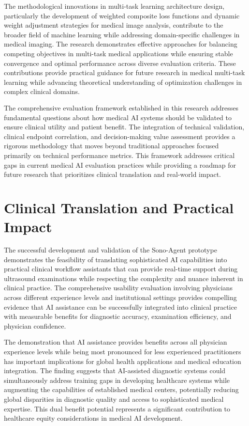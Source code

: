 The methodological innovations in multi-task learning architecture design, particularly the development of weighted composite loss functions and dynamic weight adjustment strategies for medical image analysis, contribute to the broader field of machine learning while addressing domain-specific challenges in medical imaging. The research demonstrates effective approaches for balancing competing objectives in multi-task medical applications while ensuring stable convergence and optimal performance across diverse evaluation criteria. These contributions provide practical guidance for future research in medical multi-task learning while advancing theoretical understanding of optimization challenges in complex clinical domains.

The comprehensive evaluation framework established in this research addresses fundamental questions about how medical AI systems should be validated to ensure clinical utility and patient benefit. The integration of technical validation, clinical endpoint correlation, and decision-making value assessment provides a rigorous methodology that moves beyond traditional approaches focused primarily on technical performance metrics. This framework addresses critical gaps in current medical AI evaluation practices while providing a roadmap for future research that prioritizes clinical translation and real-world impact.

\section{Clinical Translation and Practical Impact}

The successful development and validation of the Sono-Agent prototype demonstrates the feasibility of translating sophisticated AI capabilities into practical clinical workflow assistants that can provide real-time support during ultrasound examinations while respecting the complexity and nuance inherent in clinical practice. The comprehensive usability evaluation involving physicians across different experience levels and institutional settings provides compelling evidence that AI assistance can be successfully integrated into clinical practice with measurable benefits for diagnostic accuracy, examination efficiency, and physician confidence.

The demonstration that AI assistance provides benefits across all physician experience levels while being most pronounced for less experienced practitioners has important implications for global health applications and medical education integration. The finding suggests that AI-assisted diagnostic systems could simultaneously address training gaps in developing healthcare systems while augmenting the capabilities of established medical centers, potentially reducing global disparities in diagnostic quality and access to sophisticated medical expertise. This dual benefit potential represents a significant contribution to healthcare equity considerations in medical AI development.

